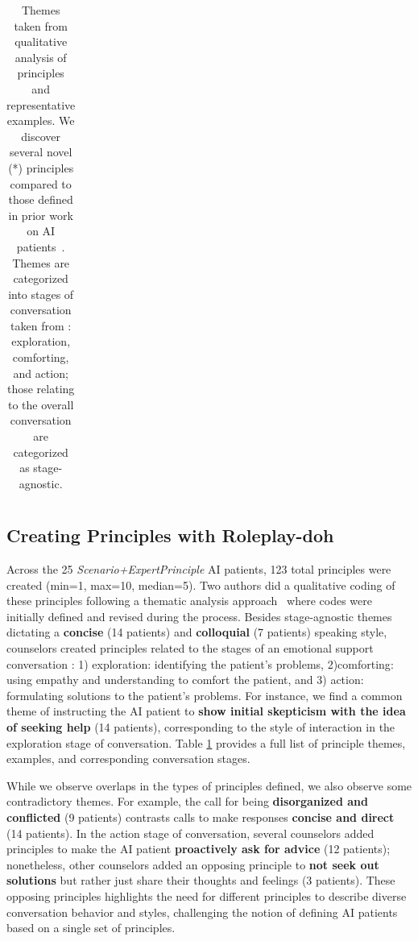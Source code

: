 \documentclass[11pt]{article}
\begin{document}
\begin{table}
{\begin{tabular}{|p{0.1cm}|p{.1cm}|p{.1cm}|c|p{5cm}|p{8cm}|}
    \end{tabular}}
    \caption{\small{Themes taken from qualitative analysis of principles and representative examples. We discover several novel (\colorbox{yellow!30}{*}) principles compared to those defined in prior work on AI patients~\cite{chen2023llmempowered, stapleton2023seeing}. Themes are categorized into stages of conversation taken from \cite{liu-etal-2021-towards}: \colorbox{orange!40}{exploration}, \colorbox{blue!30}{comforting}, and \colorbox{green!60}{action}; those relating to the overall conversation are categorized as \colorbox{gray!60}{stage-agnostic}.}}
    \label{tab:principle_table}
\end{table}


\subsection{Creating Principles with Roleplay-doh}
Across the 25 \textit{Scenario+ExpertPrinciple} AI patients, 123 total principles were created (min=1, max=10, median=5). Two authors did a qualitative coding of these principles following a thematic analysis approach~\cite{braun2006thematicanalysis} where codes were initially defined and revised during the process.
Besides \colorbox{gray!60}{stage-agnostic} themes dictating a \textbf{concise} (14 patients) and \textbf{colloquial} (7 patients) speaking style, counselors created principles related to the stages of an emotional support conversation \cite{liu-etal-2021-towards}: 1) \colorbox{orange!40}{exploration}: identifying the patient's problems, 2)\colorbox{blue!30}{comforting}: using empathy and understanding to comfort the patient, and 3) \colorbox{green!60}{action}: formulating solutions to the patient's problems. For instance, we find a common theme of instructing the AI patient to \textbf{show initial skepticism with the idea of seeking help} (14 patients), corresponding to the style of interaction in the \colorbox{orange!40}{exploration} stage of conversation. Table \ref{tab:principle_table} provides a full list of principle themes, examples, and corresponding conversation stages. 

While we observe overlaps in the types of principles defined, we also observe some contradictory themes. For example, the call for being \textbf{disorganized and conflicted} (9 patients) contrasts calls to make responses \textbf{concise and direct} (14 patients). In the \colorbox{green!60}{action} stage of conversation, several counselors added principles to make the AI patient \textbf{proactively ask for advice} (12 patients); nonetheless, other counselors added an opposing principle to \textbf{not seek out solutions} but rather just share their thoughts and feelings (3 patients). These opposing principles highlights the need for different principles to describe diverse conversation behavior and styles, challenging the notion of defining AI patients based on a single set of principles. 
\end{document}

